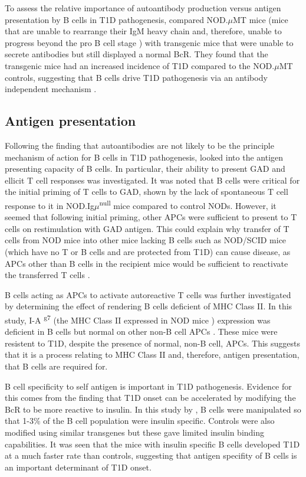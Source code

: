 To assess the relative importance of autoantibody production versus antigen presentation by B cells in T1D pathogenesis, \citet{Wong2004} compared NOD.$\mu$MT mice (mice that are unable to rearrange their IgM heavy chain and, therefore, unable to progress beyond the pro B cell stage \citep{Kitamura1991}) with transgenic mice that were unable to secrete antibodies but still displayed a normal BcR.
They found that the transgenic mice had an increased incidence of T1D compared to the NOD.$\mu$MT controls, suggesting that B cells drive T1D pathogenesis via an antibody independent mechanism \citep{Wong2004}.



\subsection{Antigen presentation}


Following the finding that autoantibodies are not likely to be the principle mechanism of action for B cells in T1D pathogenesis, \citet{Serreze1998} looked into the antigen presenting capacity of B cells.
In particular, their ability to present GAD and ellicit T cell responses was investigated.
It was noted that B cells were critical for the initial priming of T cells to GAD, shown by the lack of spontaneous T cell response to it in NOD.Ig$\mu$\textsuperscript{null} mice compared to control NODs.
However, it seemed that following initial priming, other APCs were sufficient to present to T cells on restimulation with GAD antigen.
This could explain why transfer of T cells from NOD mice into other mice lacking B cells such as NOD/SCID mice (which have no T or B cells and are protected from T1D) can cause disease, as APCs other than B cells in the recipient mice would be sufficient to reactivate the transferred T cells \citep{Charlton2001}.

B cells acting as APCs to activate autoreactive T cells was further investigated by determining the effect of rendering B cells deficient of MHC Class II.
In this study, I-A\textsuperscript{
g7} (the MHC Class II expressed in NOD mice \citep{Stratmann2000}) expression was deficient in B cells but normal on other non-B cell APCs \citep{Noorchashm1999}.
These mice were resistent to T1D, despite the presence of normal, non-B cell, APCs. 
This suggests that it is a process relating to MHC Class II and, therefore, antigen presentation, that B cells are required for.


B cell specificity to self antigen is important in T1D pathogenesis.
Evidence for this comes from the finding that T1D onset can be accelerated by modifying the BcR to be more reactive to insulin.
In this study by \citet{Hulbert2001}, B cells were manipulated so that 1-3\% of the B cell population were insulin specific.
Controls were also modified using similar transgenes but these gave limited insulin binding capabilities.
It was seen that the mice with insulin specific B cells developed T1D at a much faster rate than controls, suggesting that antigen specifity of B cells is an important determinant of T1D onset.



